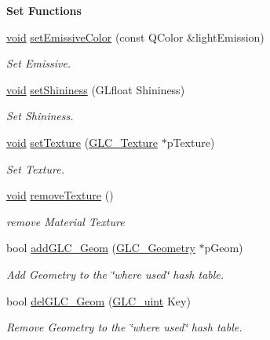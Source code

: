\begin{Indent}{\bf Set Functions}
\begin{DoxyCompactItemize}
\hyperlink{group___u_a_v_objects_plugin_ga444cf2ff3f0ecbe028adce838d373f5c}{void} \hyperlink{class_g_l_c___material_a20c736f0c67536020a6a7a7bbb154a84}{set\-Emissive\-Color} (const Q\-Color \&light\-Emission)
\begin{DoxyCompactList}\small\item\em Set Emissive. \end{DoxyCompactList}\item 
\hyperlink{group___u_a_v_objects_plugin_ga444cf2ff3f0ecbe028adce838d373f5c}{void} \hyperlink{class_g_l_c___material_addce1cf4c4d210f008b1a9f766261718}{set\-Shininess} (G\-Lfloat Shininess)
\begin{DoxyCompactList}\small\item\em Set Shininess. \end{DoxyCompactList}\item 
\hyperlink{group___u_a_v_objects_plugin_ga444cf2ff3f0ecbe028adce838d373f5c}{void} \hyperlink{class_g_l_c___material_a4cd6f81a640b2d37f1113def3fcbdbe0}{set\-Texture} (\hyperlink{class_g_l_c___texture}{G\-L\-C\-\_\-\-Texture} $\ast$p\-Texture)
\begin{DoxyCompactList}\small\item\em Set Texture. \end{DoxyCompactList}\item 
\hyperlink{group___u_a_v_objects_plugin_ga444cf2ff3f0ecbe028adce838d373f5c}{void} \hyperlink{class_g_l_c___material_a3af525a6553a551e68a3e661b5604aa4}{remove\-Texture} ()
\begin{DoxyCompactList}\small\item\em remove Material Texture \end{DoxyCompactList}\item 
bool \hyperlink{class_g_l_c___material_a9c9afd122d374cf3a71235933bc2382d}{add\-G\-L\-C\-\_\-\-Geom} (\hyperlink{class_g_l_c___geometry}{G\-L\-C\-\_\-\-Geometry} $\ast$p\-Geom)
\begin{DoxyCompactList}\small\item\em Add Geometry to the \char`\"{}where used\char`\"{} hash table. \end{DoxyCompactList}\item 
bool \hyperlink{class_g_l_c___material_ad8eb0fabe8fc995e7679f8519e9c0b04}{del\-G\-L\-C\-\_\-\-Geom} (\hyperlink{glc__global_8h_abf950976fabed69026558df8e2da6c6b}{G\-L\-C\-\_\-uint} Key)
\begin{DoxyCompactList}\small\item\em Remove Geometry to the \char`\"{}where used\char`\"{} hash table. \end{DoxyCompactList}\item 

\end{DoxyCompactItemize}
\end{Indent}
